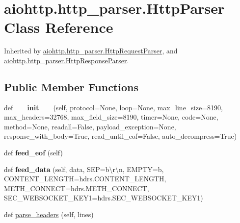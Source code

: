 \hypertarget{classaiohttp_1_1http__parser_1_1_http_parser}{}\section{aiohttp.\+http\+\_\+parser.\+Http\+Parser Class Reference}
\label{classaiohttp_1_1http__parser_1_1_http_parser}


Inherited by \hyperlink{classaiohttp_1_1http__parser_1_1_http_request_parser}{aiohttp.\+http\+\_\+parser.\+Http\+Request\+Parser}, and \hyperlink{classaiohttp_1_1http__parser_1_1_http_response_parser}{aiohttp.\+http\+\_\+parser.\+Http\+Response\+Parser}.

\subsection*{Public Member Functions}
\begin{DoxyCompactItemize}
\item 
\mbox{\label{classaiohttp_1_1http__parser_1_1_http_parser_a36b8a2561d657f2a416951684a6c5195}} 
def {\bfseries \+\_\+\+\_\+init\+\_\+\+\_\+} (self, protocol=None, loop=None, max\+\_\+line\+\_\+size=8190, max\+\_\+headers=32768, max\+\_\+field\+\_\+size=8190, timer=None, code=None, method=None, readall=False, payload\+\_\+exception=None, response\+\_\+with\+\_\+body=True, read\+\_\+until\+\_\+eof=False, auto\+\_\+decompress=True)
\item 
\mbox{\label{classaiohttp_1_1http__parser_1_1_http_parser_a7a692f8d90703855e6b0d40476492a16}} 
def {\bfseries feed\+\_\+eof} (self)
\item 
\mbox{\label{classaiohttp_1_1http__parser_1_1_http_parser_af0ceedab2ed271b24765e5d50bcec10f}} 
def {\bfseries feed\+\_\+data} (self, data, S\+EP=b\textquotesingle{}\textbackslash{}r\textbackslash{}n\textquotesingle{}, E\+M\+P\+TY=b\textquotesingle{}\textquotesingle{}, C\+O\+N\+T\+E\+N\+T\+\_\+\+L\+E\+N\+G\+TH=hdrs.\+C\+O\+N\+T\+E\+N\+T\+\_\+\+L\+E\+N\+G\+TH, M\+E\+T\+H\+\_\+\+C\+O\+N\+N\+E\+CT=hdrs.\+M\+E\+T\+H\+\_\+\+C\+O\+N\+N\+E\+CT, S\+E\+C\+\_\+\+W\+E\+B\+S\+O\+C\+K\+E\+T\+\_\+\+K\+E\+Y1=hdrs.\+S\+E\+C\+\_\+\+W\+E\+B\+S\+O\+C\+K\+E\+T\+\_\+\+K\+E\+Y1)
\item 
def \hyperlink{classaiohttp_1_1http__parser_1_1_http_parser_a290b57971f5601f24455642f72c28551}{parse\+\_\+headers} (self, lines)
\end{DoxyCompactItemize}
